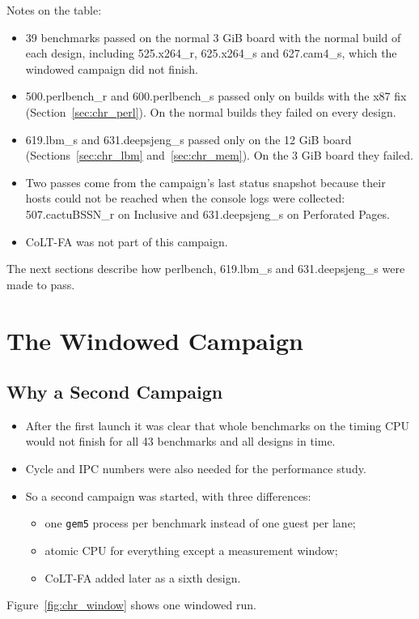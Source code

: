 \noindent Notes on the table:
\begin{itemize}
    \item 39 benchmarks passed on the normal 3 GiB board with the normal build of each design, including 525.x264\_r, 625.x264\_s and 627.cam4\_s, which the windowed campaign did not finish.
    \item 500.perlbench\_r and 600.perlbench\_s passed only on builds with the x87 fix (Section~\ref{sec:chr_perl}). On the normal builds they failed on every design.
    \item 619.lbm\_s and 631.deepsjeng\_s passed only on the 12 GiB board (Sections~\ref{sec:chr_lbm} and~\ref{sec:chr_mem}). On the 3 GiB board they failed.
    \item Two passes come from the campaign's last status snapshot because their hosts could not be reached when the console logs were collected: 507.cactuBSSN\_r on Inclusive and 631.deepsjeng\_s on Perforated Pages.
    \item CoLT-FA was not part of this campaign.
\end{itemize}
The next sections describe how perlbench, 619.lbm\_s and 631.deepsjeng\_s were made to pass.

\section{The Windowed Campaign}
\label{sec:chr_window}

\subsection{Why a Second Campaign}
\begin{itemize}
    \item After the first launch it was clear that whole benchmarks on the timing CPU would not finish for all 43 benchmarks and all designs in time.
    \item Cycle and IPC numbers were also needed for the performance study.
    \item So a second campaign was started, with three differences:
    \begin{itemize}
        \item one \texttt{gem5} process per benchmark instead of one guest per lane;
        \item atomic CPU for everything except a measurement window;
        \item CoLT-FA added later as a sixth design.
    \end{itemize}
\end{itemize}
Figure~\ref{fig:chr_window} shows one windowed run.

